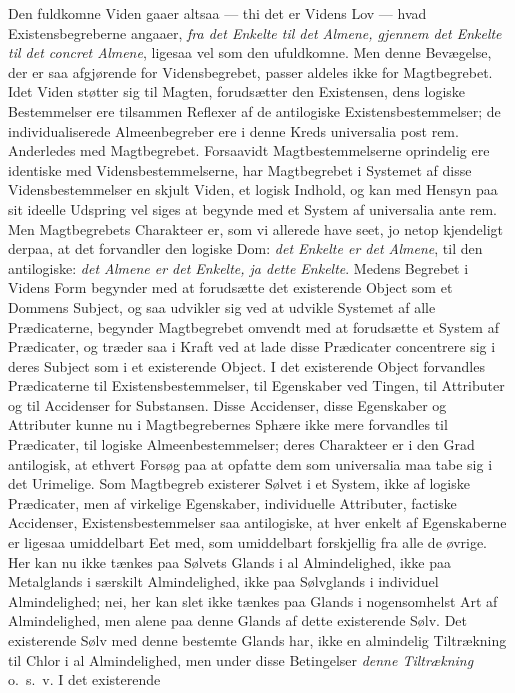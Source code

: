 \documentclass[12pt]{book}
\newcommand{\opage}[1]{\marginnote{\footnotesize\textit{[#1]}}}
\begin{document}
Den fuldkomne Viden gaaer altsaa --- thi det er Videns Lov --- hvad Existensbegreberne angaaer,
\emph{fra det Enkelte til det Almene, gjennem det Enkelte til det concret Almene}, ligesaa vel som
den ufuldkomne. Men denne Bevægelse, der er saa afgjørende for Vidensbegrebet, passer aldeles ikke
for Magtbegrebet. Idet Viden støtter sig til Magten, forudsætter den Existensen, dens logiske
Bestemmelser ere tilsammen Reflexer af de antilogiske Existensbestemmelser; de individualiserede
Almeenbegreber ere i denne Kreds universalia post rem. Anderledes med Magtbegrebet. Forsaavidt
Magtbestemmelserne oprindelig ere identiske med Vidensbestemmelserne, har Magtbegrebet i Systemet af
disse Vidensbestemmelser en skjult Viden, et logisk Indhold, og kan med Hensyn paa sit ideelle
Udspring vel siges at begynde med et System af universalia ante rem. Men Magtbegrebets Charakteer
er, som vi allerede have seet, jo netop kjendeligt derpaa, at det forvandler den logiske Dom:
\emph{det Enkelte er det Almene}, til den antilogiske: \emph{det Almene er det Enkelte, ja dette
Enkelte}. Medens Begrebet i Videns Form begynder med at forudsætte det existerende Object som et
Dommens Subject, og saa udvikler sig ved at udvikle Systemet af alle Prædicaterne, begynder
Magtbegrebet omvendt med at forudsætte et System af Prædicater, og træder saa i Kraft ved at lade
disse Prædicater concentrere sig i deres Subject som i et existerende Object. I det existerende
Object forvandles Prædicaterne til Existensbestemmelser, til Egenskaber ved Tingen, til Attributer
og til Accidenser for Substansen. Disse Accidenser, disse Egenskaber og Attributer kunne nu i
Magtbegrebernes Sphære ikke mere forvandles til Prædicater, til logiske Almeenbestemmelser; deres
Charakteer er i den Grad antilogisk, at ethvert Forsøg paa at opfatte dem som universalia maa tabe
sig i det Urimelige. Som
\opage{204} Magtbegreb existerer Sølvet i et System, ikke af logiske Prædicater, men af virkelige Egenskaber,
individuelle Attributer, factiske Accidenser, Existensbestemmelser saa antilogiske, at hver enkelt
af Egenskaberne er ligesaa umiddelbart Eet med, som umiddelbart forskjellig fra alle de øvrige.
Her kan nu ikke tænkes paa Sølvets Glands i al Almindelighed, ikke paa Metalglands i særskilt
Almindelighed, ikke paa Sølvglands i individuel Almindelighed; nei, her kan slet ikke tænkes paa
Glands i nogensomhelst Art af Almindelighed, men alene paa denne Glands af dette existerende Sølv.
Det existerende Sølv med denne bestemte Glands har, ikke en almindelig Tiltrækning til Chlor i al
Almindelighed, men under disse Betingelser \emph{denne Tiltrækning} o.\ s.\ v. I det existerende
\end{document}
